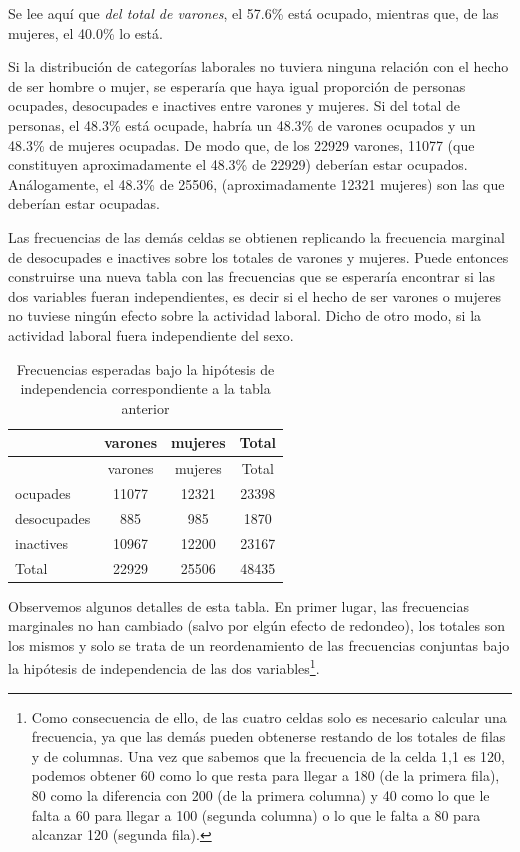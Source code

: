 \documentclass[]{book}
\let\rmarkdownfootnote\footnote%
\def\footnote{\protect\rmarkdownfootnote}
\begin{document}
Se lee aquí que \emph{del total de varones}, el 57.6\% está ocupado, mientras que, de las mujeres, el 40.0\% lo está.

Si la distribución de categorías laborales no tuviera ninguna relación con el hecho de ser hombre o mujer, se esperaría que haya igual proporción de personas ocupades, desocupades e inactives entre varones y mujeres. Si del total de personas, el 48.3\% está ocupade, habría un 48.3\% de varones ocupados y un 48.3\% de mujeres ocupadas. De modo que, de los 22929 varones, 11077 (que constituyen aproximadamente el 48.3\% de 22929) deberían estar ocupados. Análogamente, el 48.3\% de 25506,
(aproximadamente 12321 mujeres) son las que deberían estar ocupadas.

Las frecuencias de las demás celdas se obtienen replicando la frecuencia marginal de desocupades e inactives sobre los totales de varones y mujeres. Puede entonces construirse una nueva tabla con las frecuencias que se esperaría encontrar si las dos variables fueran independientes, es decir si el hecho de ser varones o mujeres no tuviese ningún efecto sobre la actividad laboral. Dicho de otro modo, si la actividad laboral fuera independiente del sexo.

\begin{longtable}[]{@{}lccc@{}}
\caption{\label{tab:unnamed-chunk-143}Frecuencias esperadas bajo la hipótesis de independencia
correspondiente a la tabla anterior}\tabularnewline
\toprule
& varones & mujeres & Total\tabularnewline
\midrule
\endfirsthead
\toprule
& varones & mujeres & Total\tabularnewline
\midrule
\endhead
ocupades & 11077 & 12321 & 23398\tabularnewline
desocupades & 885 & 985 & 1870\tabularnewline
inactives & 10967 & 12200 & 23167\tabularnewline
Total & 22929 & 25506 & 48435\tabularnewline
\bottomrule
\end{longtable}

Observemos algunos detalles de esta tabla. En primer lugar, las frecuencias marginales no han cambiado (salvo por elgún efecto de redondeo), los totales son los mismos y solo se trata de un reordenamiento de las frecuencias conjuntas bajo la hipótesis de independencia de las dos variables\footnote{Como consecuencia de ello, de las cuatro celdas solo es necesario calcular una frecuencia, ya que las demás pueden obtenerse restando de los totales de filas y de columnas. Una vez que sabemos que la frecuencia de la celda 1,1 es 120, podemos obtener 60 como lo que resta para llegar a 180 (de la primera fila), 80 como la diferencia con 200 (de la primera columna) y 40 como lo que le falta a 60 para llegar a 100 (segunda columna) o lo que le falta a 80 para alcanzar 120 (segunda fila).}.
\end{document}
